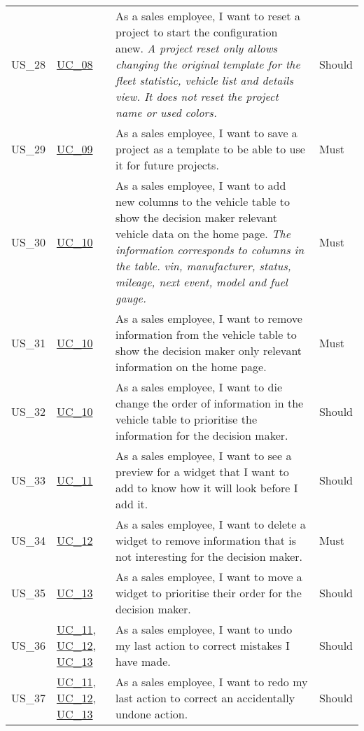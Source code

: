 \begin{footnotesize}
\begin{longtable}[L L L L]{ p{} p{} p{} p{} }
      \hypertarget{Ref:US28}{US\_28} & \hyperlink{Ref:UC8}{UC\_08} & As a sales employee, I want to reset a project to start the configuration anew. 
      \newline
      \emph{A project reset only allows changing the original template for the fleet statistic, vehicle list and details view. It does not reset the project name or used colors.} & Should \\
      \hypertarget{Ref:US29}{US\_29} & \hyperlink{Ref:UC9}{UC\_09} & As a sales employee, I want to save a project as a template to be able to use it for future projects. & Must \\
      \hypertarget{Ref:US30}{US\_30} & \hyperlink{Ref:UC10}{UC\_10} & As a sales employee, I want to add new columns to the vehicle table to show the decision maker relevant vehicle data on the home page.
      \newline
      \emph{The information corresponds to columns in the table. \gls{vin}, manufacturer, status, mileage, next event, model and fuel gauge.} & Must  \\
      \hypertarget{Ref:US31}{US\_31} & \hyperlink{Ref:UC10}{UC\_10} & As a sales employee, I want to remove information from the vehicle table to show the decision maker only relevant information on the home page. & Must  \\
      \hypertarget{Ref:US32}{US\_32} & \hyperlink{Ref:UC10}{UC\_10} & As a sales employee, I want to die change the order of information in the vehicle table to prioritise the information for the decision maker. & Should  \\

      \hypertarget{Ref:US33}{US\_33} & \hyperlink{Ref:UC11}{UC\_11} & As a sales employee, I want to see a preview for a \gls{widget} that I want to add to know how it will look before I add it. & Should \\
      \hypertarget{Ref:US34}{US\_34} & \hyperlink{Ref:UC12}{UC\_12} & As a sales employee, I want to delete a \gls{widget} to remove information that is not interesting for the decision maker. & Must \\
      \hypertarget{Ref:US35}{US\_35} & \hyperlink{Ref:UC13}{UC\_13} \  & As a sales employee, I want to move a \gls{widget} to prioritise their order for the decision maker. & Should \\
      \hypertarget{Ref:US36}{US\_36} & \hyperlink{Ref:UC11}{UC\_11}, \newline \hyperlink{Ref:UC12}{UC\_12}, \newline \hyperlink{Ref:UC13}{UC\_13} & As a sales employee, I want to undo my last action to correct mistakes I have made. & Should \\
      \hypertarget{Ref:US37}{US\_37} & \hyperlink{Ref:UC11}{UC\_11}, \newline \hyperlink{Ref:UC12}{UC\_12}, \newline \hyperlink{Ref:UC13}{UC\_13} & As a sales employee, I want to redo my last action to correct an accidentally undone action. & Should \\
      \bottomrule
    \end{longtable}
  \end{footnotesize}

